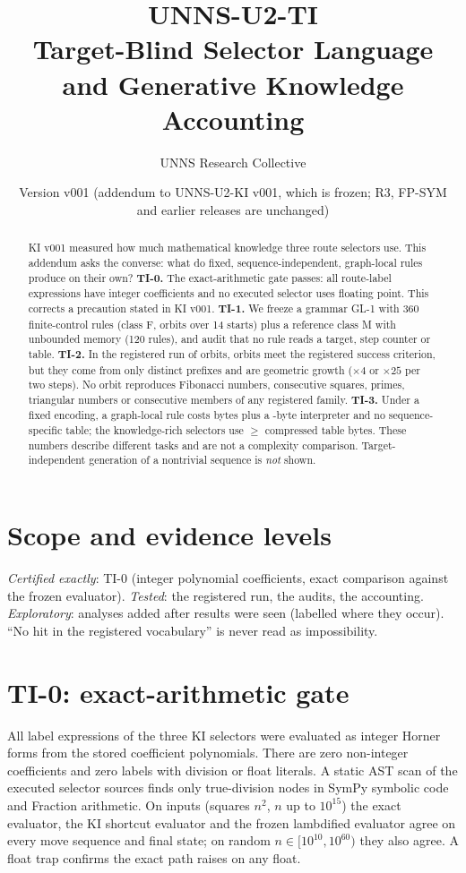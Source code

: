 \documentclass[11pt]{article}
\title{\textbf{UNNS-U2-TI}\\[2pt]\large Target-Blind Selector Language and Generative Knowledge Accounting}
\author{UNNS Research Collective}
\date{Version v001 \quad (addendum to UNNS-U2-KI v001, which is frozen; R3, FP-SYM and earlier releases are unchanged)}
\begin{document}
\maketitle
\begin{abstract}\noindent
KI v001 measured how much mathematical knowledge three route selectors use. This addendum asks the converse: what do fixed, sequence-independent, graph-local rules produce on their own? \textbf{TI-0.} The exact-arithmetic gate passes: all \NLabels{} route-label expressions have integer coefficients and no executed selector uses floating point. This corrects a precaution stated in KI v001. \textbf{TI-1.} We freeze a grammar GL-1 with 360 finite-control rules (class F, \OrbitsF{} orbits over 14 starts) plus a reference class M with unbounded memory (120 rules), and audit that no rule reads a target, step counter or table. \textbf{TI-2.} In the registered run of \Orbits{} orbits, \Succ{} orbits meet the registered success criterion, but they come from only \SuccPrefixes{} distinct prefixes and are geometric growth ($\times4$ or $\times25$ per two steps). No orbit reproduces Fibonacci numbers, consecutive squares, primes, triangular numbers or consecutive members of any registered family. \textbf{TI-3.} Under a fixed encoding, a graph-local rule costs \RuleBytes{} bytes plus a \IntBytes-byte interpreter and no sequence-specific table; the knowledge-rich selectors use $\geq$\SqWTabZ{} compressed table bytes. These numbers describe different tasks and are not a complexity comparison. Target-independent generation of a nontrivial sequence is \emph{not} shown.
\end{abstract}

\section{Scope and evidence levels}
\emph{Certified exactly}: TI-0 (integer polynomial coefficients, exact comparison against the frozen evaluator). \emph{Tested}: the registered run, the audits, the accounting. \emph{Exploratory}: analyses added after results were seen (labelled where they occur). ``No hit in the registered vocabulary'' is never read as impossibility.

\section{TI-0: exact-arithmetic gate}
All \NLabels{} label expressions of the three KI selectors were evaluated as integer Horner forms from the stored coefficient polynomials. There are zero non-integer coefficients and zero labels with division or float literals. A static AST scan of the executed selector sources finds only true-division nodes in SymPy symbolic code and Fraction arithmetic. On \DomN{} inputs (squares $n^2$, $n$ up to $10^{15}$) the exact evaluator, the KI shortcut evaluator and the frozen lambdified evaluator agree on every move sequence and final state; on \ExtN{} random $n\in[10^{10},10^{60})$ they also agree. A float trap confirms the exact path raises on any float.
\end{document}
